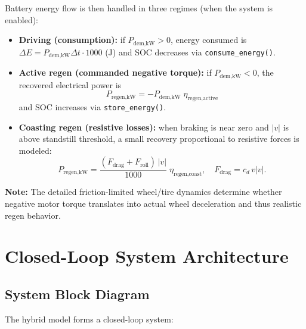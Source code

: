 \documentclass[11pt,a4paper]{article}
\begin{document}
Battery energy flow is then handled in three regimes (when the system is enabled):
\begin{itemize}
    \item \textbf{Driving (consumption):} if $P_{\text{dem,kW}} > 0$, energy consumed is
    $\Delta E = P_{\text{dem,kW}}\Delta t \cdot 1000$ (J) and SOC decreases via \texttt{consume\_energy()}.
    \item \textbf{Active regen (commanded negative torque):} if $P_{\text{dem,kW}} < 0$, the recovered electrical power is
    \begin{equation}
    P_{\text{regen,kW}} = -P_{\text{dem,kW}}\;\eta_{\text{regen,active}}
    \label{eq:regen_active}
    \end{equation}
    and SOC increases via \texttt{store\_energy()}.
    \item \textbf{Coasting regen (resistive losses):} when braking is near zero and $|v|$ is above standstill threshold,
    a small recovery proportional to resistive forces is modeled:
    \begin{equation}
    P_{\text{regen,kW}} = \frac{(F_{\text{drag}}+F_{\text{roll}})\,|v|}{1000}\;\eta_{\text{regen,coast}},
    \quad
    F_{\text{drag}} = c_d\,v|v|.
    \label{eq:regen_coast}
    \end{equation}
\end{itemize}

\textbf{Note:} The detailed friction-limited wheel/tire dynamics determine whether negative motor torque translates into actual wheel deceleration and thus realistic regen behavior.



\section{Closed-Loop System Architecture}
\label{sec:closed_loop}

\subsection{System Block Diagram}

The hybrid model forms a closed-loop system:
\end{document}
